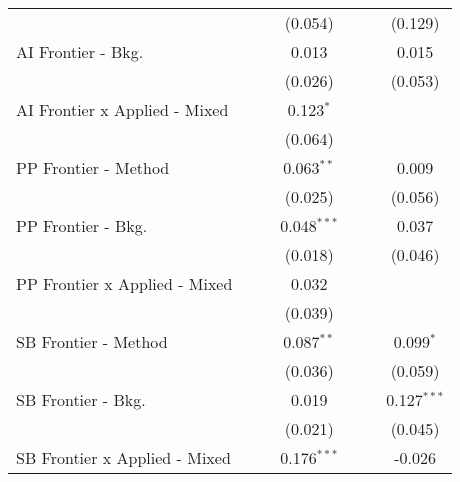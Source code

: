 \begin{tabular}{lcccccc}
                                 &               &               & (0.054)       &               &             & (0.129)\\   
   AI Frontier - Bkg.            &               &               & 0.013         &               &             & 0.015\\   
                                 &               &               & (0.026)       &               &             & (0.053)\\   
   AI Frontier x Applied - Mixed &               &               & 0.123$^{*}$   &               &             &   \\   
                                 &               &               & (0.064)       &               &             &   \\   
   PP Frontier - Method          &               &               & 0.063$^{**}$  &               &             & 0.009\\   
                                 &               &               & (0.025)       &               &             & (0.056)\\   
   PP Frontier - Bkg.            &               &               & 0.048$^{***}$ &               &             & 0.037\\   
                                 &               &               & (0.018)       &               &             & (0.046)\\   
   PP Frontier x Applied - Mixed &               &               & 0.032         &               &             &   \\   
                                 &               &               & (0.039)       &               &             &   \\   
   SB Frontier - Method          &               &               & 0.087$^{**}$  &               &             & 0.099$^{*}$\\   
                                 &               &               & (0.036)       &               &             & (0.059)\\   
   SB Frontier - Bkg.            &               &               & 0.019         &               &             & 0.127$^{***}$\\   
                                 &               &               & (0.021)       &               &             & (0.045)\\   
   SB Frontier x Applied - Mixed &               &               & 0.176$^{***}$ &               &             & -0.026\\   

\end{tabular}
